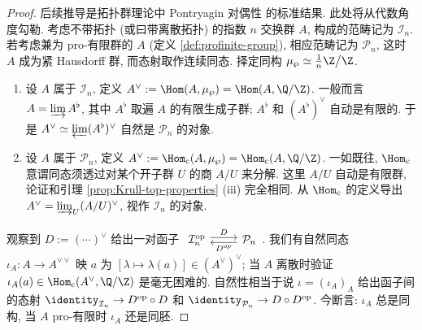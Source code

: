\begin{proof}
	后续推导是拓扑群理论中 Pontryagin 对偶性 \cite[第三章]{FL14} 的标准结果. 此处将从代数角度勾勒. 考虑不带拓扑 (或曰带离散拓扑) 的指数 $n$ 交换群 $A$, 构成的范畴记为 $\mathcal{I}_n$. 若考虑兼为 pro-有限群的 $A$ (定义 \ref{def:profinite-group}), 相应范畴记为 $\mathcal{P}_n$, 这时 $A$ 成为紧 Hausdorff 群, 而态射取作连续同态. 择定同构 $\mu_\wp \simeq \frac{1}{n}\Z \big/ \Z$.
	\begin{enumerate}
		\item 设 $A$ 属于 $\mathcal{I}_n$, 定义 $A^\vee := \Hom(A, \mu_\wp) = \Hom(A, \Q/\Z)$. 一般而言 $A = \varinjlim A^\flat$, 其中 $A^\flat$ 取遍 $A$ 的有限生成子群; $A^\flat$ 和 $(A^\flat)^\vee$ 自动是有限的. 于是 $A^\vee \simeq \varprojlim (A^\flat)^\vee$ 自然是 $\mathcal{P}_n$ 的对象.
		\item 设 $A$ 属于 $\mathcal{P}_n$, 定义 $A^\vee := \Hom_{\text{c}}(A, \mu_\wp) = \Hom_{\text{c}}(A, \Q/\Z)$. 一如既往, $\Hom_{\text{c}}$ 意谓同态须透过对某个开子群 $U$ 的商 $A/U$ 来分解. 这里 $A/U$ 自动是有限群, 论证和引理 \ref{prop:Krull-top-properties} (iii) 完全相同. 从 $\Hom_{\text{c}}$ 的定义导出 $A^\vee = \varinjlim_U (A/U)^\vee$, 视作 $\mathcal{I}_n$ 的对象.
	\end{enumerate}
	观察到 $D := (\cdots)^\vee$ 给出一对函子
	$ \begin{tikzcd} \mathcal{I}_n^\text{op} \arrow[r, yshift=0.5ex, "D"] & \arrow[l, yshift=-0.5ex, "{D^\text{op}}"] \mathcal{P}_n \end{tikzcd}$.
	我们有自然同态 $\iota_A : A \to A^{\vee\vee}$ 映 $a$ 为 $[\lambda \mapsto \lambda(a)] \in (A^\vee)^\vee$; 当 $A$ 离散时验证 $\iota_A(a) \in \Hom_{\text{c}}(A^\vee, \Q/\Z)$ 是毫无困难的. 自然性相当于说 $\iota = (\iota_A)_A$ 给出函子间的态射 $\identity_{\mathcal{I}_n} \to D^\text{op} \circ D$ 和 $\identity_{\mathcal{P}_n} \to D \circ D^\text{op}$. 今断言: $\iota_A$ 总是同构, 当 $A$ pro-有限时 $\iota_A$ 还是同胚.
	

\end{proof}
